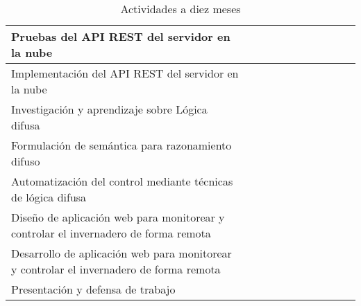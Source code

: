 \begin{table}[ht]
{\begin{tabular}{|p{8cm}|c|c|c|c|c|c|c|c|c|c|}
	\hline 
	Pruebas del API REST del servidor en la nube&  &  &  &  & \checkmark &  &  &  &  &  \\ 
	\hline 
	Implementación del API REST del servidor en la nube&  &  &  &  & \checkmark &  &  &  &  &  \\ 
	\hline 
	Investigación y aprendizaje sobre Lógica difusa&  &  &\checkmark  &\checkmark  &\checkmark  &\checkmark  &  &  &  & \\ 
	\hline 
	Formulación de semántica para razonamiento difuso&  &  &  &  &  &\checkmark  &  &  &  &  \\ 
	\hline 
	Automatización del control mediante técnicas de lógica difusa&  &  &  &  &  &  &  \checkmark & \checkmark &  &  \\ 
	\hline  
	Diseño de aplicación web para monitorear y controlar el invernadero de forma remota&  &  &  &  &  &  &  &  & \checkmark  &  \\ 
	\hline  
	Desarrollo de aplicación web para monitorear y controlar el invernadero de forma remota&  &  &  &  &  &  &  &  & \checkmark &  \\ 
	\hline  
	Presentación y defensa de trabajo&  &  &  &  &  &  &  &  &  & \checkmark  \\ 
	\hline
\end{tabular}}
    \caption{Actividades a diez meses}
\end{table}